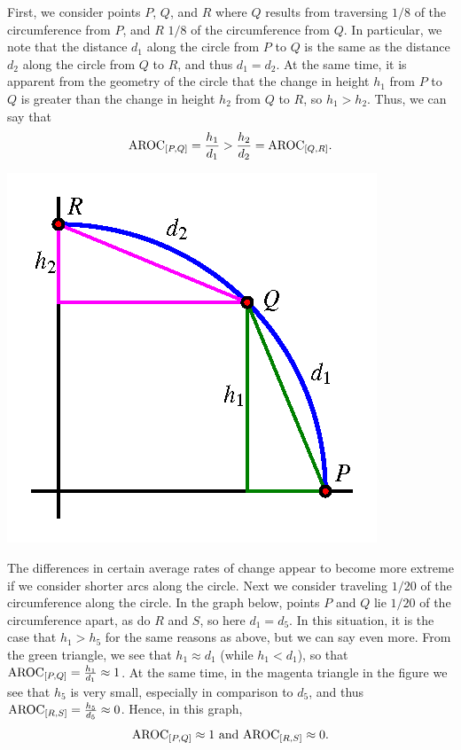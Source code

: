 \documentclass[nooutcomes, noauthor]{ximera}
\begin{document}
First, we consider points \(P\), \(Q\), and \(R\) where \(Q\) results from traversing \(1/8\) of the circumference from \(P\), and \(R\) \(1/8\) of the circumference from \(Q\).  In particular, we note that the distance \(d_1\) along the circle from \(P\) to \(Q\) is the same as the distance \(d_2\) along the circle from \(Q\) to \(R\), and thus \(d_1 = d_2\).  At the same time, it is apparent from the geometry of the circle that the change in height \(h_1\) from \(P\) to \(Q\) is greater than the change in height \(h_2\) from \(Q\) to \(R\), so \(h_1 \gt h_2\).  Thus, we can say that%
\begin{equation*}
\mathrm{AROC}_{[P,Q]} = \frac{h_1}{d_1} > \frac{h_2}{d_2} = \mathrm{AROC}_{[Q,R]} \text{.}
\end{equation*}

\begin{image}
\includegraphics{traversing-circular-aroc-circle-eighth.png}
\end{image}

The differences in certain average rates of change appear to become more extreme if we consider shorter arcs along the circle.  Next we consider traveling \(1/20\) of the circumference along the circle.  In the graph below, points \(P\) and \(Q\) lie \(1/20\) of the circumference apart, as do \(R\) and \(S\), so here \(d_1 = d_5\).  In this situation, it is the case that \(h_1 \gt h_5\) for the same reasons as above, but we can say even more.  From the green triangle, we see that \(h_1 \approx d_1\) (while \(h_1 \lt d_1\)), so that \(\mathrm{AROC}_{[P,Q]} = \frac{h_1}{d_1} \approx 1\).  At the same time, in the magenta triangle in the figure we see that \(h_5\) is very small, especially in comparison to \(d_5\), and thus \(\mathrm{AROC}_{[R,S]} = \frac{h_5}{d_5} \approx 0\).  Hence, in this graph,%
\begin{equation*}
\mathrm{AROC}_{[P,Q]} \approx 1 \text{ and } \mathrm{AROC}_{[R,S]} \approx 0\text{.}
\end{equation*}
\end{document}
